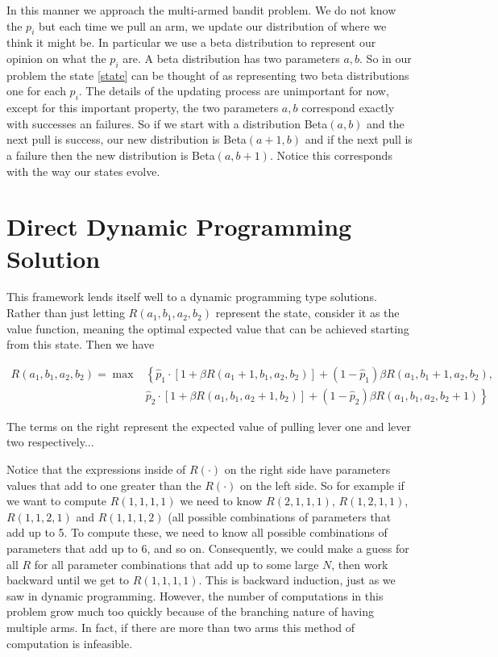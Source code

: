 In this manner we approach the multi-armed bandit problem.  We do not know the $p_i$ but each time we pull an arm, we update our distribution of where we think it might be.  In particular we use a beta distribution to represent our opinion on what the $p_i$ are.  A beta distribution has two parameters $a,b$.  So in our problem the state \eqref{state} can be thought of as representing two beta distributions one for each $p_i$. The details of the updating process are unimportant for now, except for this important property, the two parameters $a,b$ correspond exactly with successes an failures.  So if we start with a distribution Beta$(a,b)$ and the next pull is success, our new distribution is Beta$(a+1,b)$ and if the next pull is a failure then the new distribution is Beta$(a,b+1)$.  Notice this corresponds with the way our states evolve.


\section*{Direct Dynamic Programming Solution}
This framework lends itself well to a dynamic programming type solutions.  Rather than just letting $R(a_1,b_1,a_2,b_2)$ represent the state, consider it as the value function, meaning the optimal expected value that can be achieved starting from this state.  Then we have

\begin{align}\label{recurs}
R(a_1,b_1,a_2,b_2) = \max&\left\{\hat{p}_1\cdot[1 + \beta R(a_1+1,b_1,a_2,b_2)] + (1-\hat{p}_1)\beta R(a_1,b_1+1,a_2,b_2)\right. ,\\
&  \left.\hat{p}_2\cdot[1 + \beta R(a_1,b_1,a_2+1,b_2)] + (1-\hat{p}_2)\beta R(a_1,b_1,a_2,b_2+1)\right\}
\end{align}

The terms on the right represent the expected value of pulling lever one and lever two respectively...

Notice that the expressions inside of $R(\cdot)$ on the right side have parameters values that add to one greater than the $R(\cdot)$ on the left side.  So for example if we want to compute $R(1,1,1,1)$ we need to know $R(2,1,1,1)$, $R(1,2,1,1)$, $R(1,1,2,1)$ and $R(1,1,1,2)$ (all possible combinations of parameters that add up to 5.  To compute these, we need to know all possible combinations of parameters that add up to 6, and so on.  Consequently, we could make a guess for all $R$ for all parameter combinations that add up to some large $N$, then work backward until we get to $R(1,1,1,1)$.  This is backward induction, just as we saw in dynamic programming.  However, the number of computations in this problem grow much too quickly because of the branching nature of having multiple arms.  In fact, if there are more than two arms this method of computation is infeasible.  


